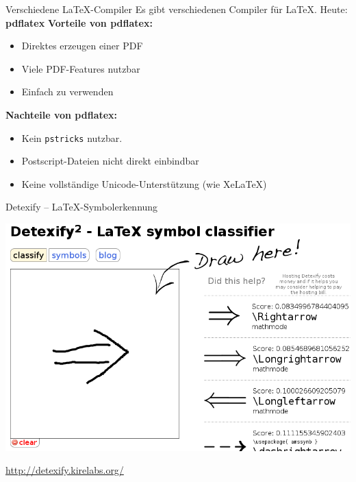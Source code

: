 \documentclass{beamer}
\begin{document}
		
		\begin{frame}{Verschiedene \LaTeX{}-Compiler}
			Es gibt verschiedenen Compiler für \LaTeX{}. Heute: \textbf{pdflatex}
			\vspace{0.2cm}
			\textbf{Vorteile von pdflatex:}
			\begin{itemize}
				\item Direktes erzeugen einer PDF
				\item Viele PDF-Features nutzbar
				\item Einfach zu verwenden
			\end{itemize}
			\vspace{0.1cm}
			\textbf{Nachteile von pdflatex:}
			\begin{itemize}
				\item Kein \texttt{pstricks} nutzbar.
				\item Postscript-Dateien nicht direkt einbindbar
				\item Keine vollständige Unicode-Unterstützung (wie Xe\LaTeX)
			\end{itemize}
		\end{frame}
		
		
		\begin{frame}{Detexify -- \LaTeX-Symbolerkennung}
			\begin{center}
				\includegraphics[width=0.95\textheight]{images/detexify}
				\vspace{0.3cm}
				
				\Large \href{http://detexify.kirelabs.org/}{http://detexify.kirelabs.org/}
			\end{center}
		\end{frame}
		
\end{document}
